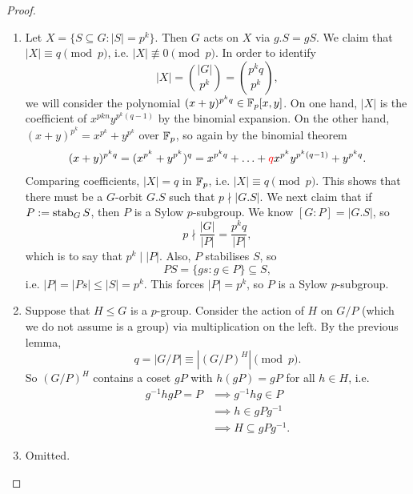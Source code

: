 \newpage

\begin{proof}~
    \begin{enumerate}[label=(\alph*)]
        \item Let $X = \{S \subseteq G: |S| = p^k\}$. Then $G$ acts on $X$ via $g.S = gS$. We claim that $|X| \equiv q \pmod{p}$, i.e. $|X| \not\equiv 0 \pmod{p}$. In order to identify
        \[
            |X| = \binom{|G|}{p^k} = \binom{p^kq}{p^k},
        \]
        we will consider the polynomial $(x + y)^{p^kq} \in \mathbb{{F}}_p[x, y]$. On one hand, $|X|$ is the coefficient of $x^{pkn} y^{p^k(q - 1)}$ by the binomial expansion. On the other hand, $(x + y)^{p^k} = x^{p^k} + y^{p^k}$ over $\mathbb{{F}}_p$, so again by the binomial theorem
        \begin{align*}
            (x + y)^{p^k q} = (x^{p^k} + y^{p^k})^q = x^{p^kq} + \ldots + \textcolor{red}{q}x^{p^k} y^{p^k(q - 1)} + y^{p^kq}.
        \end{align*}
        Comparing coefficients, $|X| = q$ in $\mathbb{{F}}_p$, i.e. $|X| \equiv q \pmod{p}$. This shows that there must be a $G$-orbit $G.S$ such that $p \nmid |G.S|$. We next claim that if $P := \operatorname{stab}_{{G}}{{S}}$, then $P$ is a Sylow $p$-subgroup. We know $[G : P] = |G.S|$, so
        \[
            p \nmid \frac{|G|}{|P|} = \frac{p^kq}{|P|},
        \]
        which is to say that $p^k \mid |P|$. Also, $P$ stabilises $S$, so
        \[
            PS = \{gs: g \in P\} \subseteq S,
        \]
        i.e. $|P| = |Ps| \leq |S| = p^k$. This forces $|P| = p^k$, so $P$ is a Sylow $p$-subgroup.
        
        \item Suppose that $H \leq G$ is a $p$-group. Consider the action of $H$ on $G/P$ (which we do not assume is a group) via multiplication on the left. By the previous lemma,
        \[
            q = |G/P| \equiv \left|(G/P)^H\right| \pmod{p}.
        \]
        So $(G/P)^H$ contains a coset $gP$ with $h(gP) = gP$ for all $h \in H$, i.e.
        \begin{align*}
           g^{-1}hgP = P
           &\implies g^{-1}hg \in P \\
           &\implies h \in gPg^{-1} \\
           &\implies H \subseteq gPg^{-1}.
        \end{align*}
    
        \item Omitted. \qedhere
    \end{enumerate}
\end{proof}

